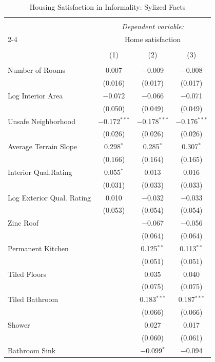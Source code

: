 
\begin{table}[H] \centering 
  \caption{Housing Satisfaction in Informality: Sylized Facts} 
  \label{reg_TABLE4} 
\scriptsize 
\begin{tabular}{@{\extracolsep{-7pt}}lccc} 
\\[-1.8ex]\hline 
\hline \\[-1.8ex] 
 & \multicolumn{3}{c}{\textit{Dependent variable:}} \\ 
\cline{2-4} 
 & \multicolumn{3}{c}{Home satisfaction} \\ 
\\[-1.8ex] & (1) & (2) & (3)\\ 
\hline \\[-1.8ex] 
 Number of Rooms & 0.007 & $-$0.009 & $-$0.008 \\ 
  & (0.016) & (0.017) & (0.017) \\ 
  Log Interior Area & $-$0.072 & $-$0.066 & $-$0.071 \\ 
  & (0.050) & (0.049) & (0.049) \\ 
  Unsafe Neighborhood & $-$0.172$^{***}$ & $-$0.178$^{***}$ & $-$0.176$^{***}$ \\ 
  & (0.026) & (0.026) & (0.026) \\ 
  Average Terrain Slope & 0.298$^{*}$ & 0.285$^{*}$ & 0.307$^{*}$ \\ 
  & (0.166) & (0.164) & (0.165) \\ 
  Interior Qual.Rating & 0.055$^{*}$ & 0.013 & 0.016 \\ 
  & (0.031) & (0.033) & (0.033) \\ 
  Log Exterior Qual. Rating & 0.010 & $-$0.032 & $-$0.033 \\ 
  & (0.053) & (0.054) & (0.054) \\ 
  Zinc Roof &  & $-$0.067 & $-$0.056 \\ 
  &  & (0.064) & (0.064) \\ 
  Permanent Kitchen &  & 0.125$^{**}$ & 0.113$^{**}$ \\ 
  &  & (0.051) & (0.051) \\ 
  Tiled Floors &  & 0.035 & 0.040 \\ 
  &  & (0.075) & (0.075) \\ 
  Tiled Bathroom &  & 0.183$^{***}$ & 0.187$^{***}$ \\ 
  &  & (0.066) & (0.066) \\ 
  Shower &  & 0.027 & 0.017 \\ 
  &  & (0.060) & (0.061) \\ 
  Bathroom Sink &  & $-$0.099$^{*}$ & $-$0.094 \\ 

\end{tabular}
\end{table}
